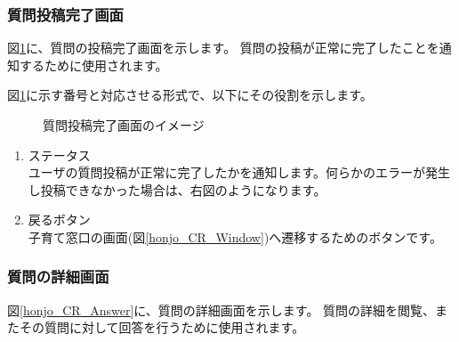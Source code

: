 \documentclass[a4j]{jarticle}
\begin{document}
\newpage
\subsubsection{質問投稿完了画面}
図\ref{honjo_CR_CompleteContribution}に、質問の投稿完了画面を示します。
質問の投稿が正常に完了したことを通知するために使用されます。

図\ref{honjo_CR_CompleteContribution}に示す番号と対応させる形式で、以下にその役割を示します。

\begin{figure}[H]
    \begin{center}
    \caption {質問投稿完了画面のイメージ}
    \label{honjo_CR_CompleteContribution}
    \end{center}
\end{figure}

\begin{enumerate}
  \renewcommand{\labelenumi}{\textcircled{\scriptsize \theenumi}}
  \item ステータス\\
        ユーザの質問投稿が正常に完了したかを通知します。何らかのエラーが発生し投稿できなかった場合は、右図のようになります。
  \item 戻るボタン\\
        子育て窓口の画面(図\ref{honjo_CR_Window})へ遷移するためのボタンです。
\end{enumerate}


\newpage
\subsubsection{質問の詳細画面}
図\ref{honjo_CR_Answer}に、質問の詳細画面を示します。
質問の詳細を閲覧、またその質問に対して回答を行うために使用されます。
\end{document}
